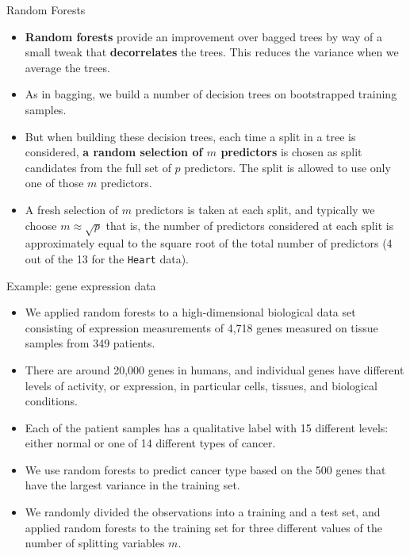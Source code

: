 \documentclass[aspectratio=169, 11pt]{beamer}
\begin{document}
\begin{frame}{Random Forests}
    \begin{itemize}
        \item \textbf{Random forests} provide an improvement over bagged trees by way of a small tweak that \textbf{decorrelates} the trees. This reduces the variance when we average the trees.
        \item As in bagging, we build a number of decision trees on bootstrapped training samples.
        \item But when building these decision trees, each time a split in a tree is considered, \textbf{a random selection of $m$ predictors} is chosen as split candidates from the full set of $p$ predictors. The split is allowed to use only one of those $m$ predictors.
        \item A fresh selection of $m$ predictors is taken at each split, and typically we choose $m \approx \sqrt{p}$ that is, the number of predictors considered at each split is approximately equal to the square root of the total number of predictors (4 out of the 13 for the \texttt{Heart} data).
    \end{itemize}
\end{frame}

\begin{frame}{Example: gene expression data}
    \begin{itemize}
        \item We applied random forests to a high-dimensional biological data set consisting of expression measurements of 4,718 genes measured on tissue samples from 349 patients.
        \item There are around 20,000 genes in humans, and individual genes have different levels of activity, or expression, in particular cells, tissues, and biological conditions.
        \item Each of the patient samples has a qualitative label with 15 different levels: either normal or one of 14 different types of cancer.
        \item We use random forests to predict cancer type based on the 500 genes that have the largest variance in the training set.
        \item We randomly divided the observations into a training and a test set, and applied random forests to the training set for three different values of the number of splitting variables $m$.
    \end{itemize}
\end{frame}
\end{document}
